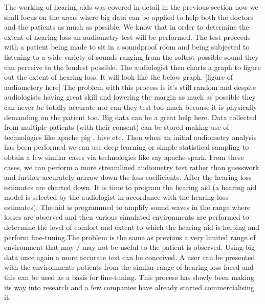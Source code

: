 \documentclass[sigconf]{acmart}
\begin{document}
The working of hearing aids was covered in detail in the previous section now we shall focus on the areas where big data can be applied to help both the doctors and the patients as much as possible. We know that in order to determine the extent of hearing loss an audiometry test will be performed. The test proceeds with a patient being made to sit in a soundproof room and being subjected to listening to a wide variety of sounds ranging from the softest possible sound they can perceive to the loudest possible. The audiologist then charts a graph to figure out the extent of hearing loss. It will look like the below graph.
[figure of audiometery here]
\newline
The problem with this process is it's still random and despite audiologists having great skill and lowering the margin as much as possible they can never be totally accurate nor can they test too much because it is physically demanding on the patient too. Big data can be a great help here. Data collected from multiple patients (with their consent) can be stored making use of technologies like apache pig , hive etc. Then when an initial audiometry analysis has been performed we can use deep learning or simple statistical sampling to obtain a few similar cases via technologies like say apache-spark. From these cases, we can perform a more streamlined audiometry test rather than guesswork and further accurately narrow down the loss coefficients. 
\newline
After the hearing loss estimates are charted down. It is time to program the hearing aid (a hearing aid model is selected by the audiologist in accordance with the hearing loss estimates). The aid is programmed to amplify sound waves in the range where losses are observed and then various simulated environments are performed to determine the level of comfort and extent to which the hearing aid is helping and perform fine-tuning.The problem is the same as previous a very limited range of environment that may / may not be useful to the patient is observed. Using big data once again a more accurate test can be conceived. A user can be presented with the environments patients from the similar range of hearing loss faced and this can be used as a basis for fine-tuning. This process has slowly been making its way into research \cite{peternordquist2017} and a few companies \cite{phonak2017} have already started commercialising it.
\newline
\end{document}
